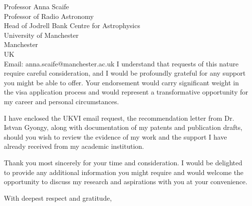 \documentclass[12pt,a4paper]{letter}
\begin{document}
\begin{letter}{Professor Anna Scaife\\Professor of Radio Astronomy\\Head of Jodrell Bank Centre for Astrophysics\\University of Manchester\\Manchester\\UK\\Email: anna.scaife@manchester.ac.uk}
I understand that requests of this nature require careful consideration, and I would be profoundly grateful for any support you might be able to offer. Your endorsement would carry significant weight in the visa application process and would represent a transformative opportunity for my career and personal circumstances.

I have enclosed the UKVI email request, the recommendation letter from Dr. Istvan Gyongy, along with documentation of my patents and publication drafts, should you wish to review the evidence of my work and the support I have already received from my academic institution.

Thank you most sincerely for your time and consideration. I would be delighted to provide any additional information you might require and would welcome the opportunity to discuss my research and aspirations with you at your convenience.

\closing{With deepest respect and gratitude,}

\signature{Deborah Akuoko}


\end{letter}
\end{document}
